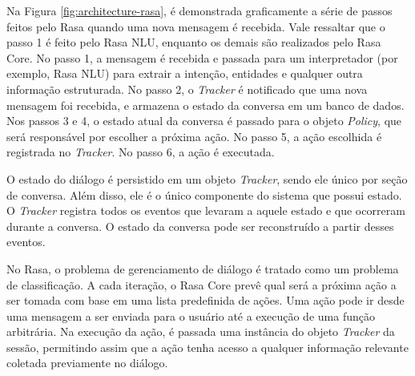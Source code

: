 Na Figura \ref{fig:architecture-rasa}, é demonstrada graficamente a série de passos feitos pelo Rasa quando uma nova mensagem é recebida. Vale ressaltar que o passo 1 é feito pelo Rasa NLU, enquanto os demais são realizados pelo Rasa Core. No passo 1, a mensagem é recebida e passada para um interpretador (por exemplo, Rasa NLU) para extrair a intenção, entidades e qualquer outra informação estruturada. No passo 2, o \textit{Tracker} é notificado que uma nova mensagem foi recebida, e armazena o estado da conversa em um banco de dados. Nos passos 3 e 4, o estado atual da conversa é passado para o objeto \textit{Policy}, que será responsável por escolher a próxima ação. No passo 5, a ação escolhida é registrada no \textit{Tracker}. No passo 6, a ação é executada.

\begin{figure}[ht] 
   	\captionsetup{width=16cm}
\end{figure}

O estado do diálogo é persistido em um objeto \textit{Tracker}, sendo ele único por seção de conversa. Além disso, ele é o único componente do sistema que possui estado. O \textit{Tracker} registra todos os eventos que levaram a aquele estado e que ocorreram durante a conversa. O estado da conversa pode ser reconstruído a partir desses eventos.

No Rasa, o problema de gerenciamento de diálogo é tratado como um problema de classificação. A cada iteração, o Rasa Core prevê qual será a próxima ação a ser tomada com base em uma lista predefinida de ações. Uma ação pode ir desde uma mensagem a ser enviada para o usuário até a execução de uma função arbitrária. Na execução da ação, é passada uma instância do objeto \textit{Tracker} da sessão, permitindo assim que a ação tenha acesso a qualquer informação relevante coletada previamente no diálogo.

